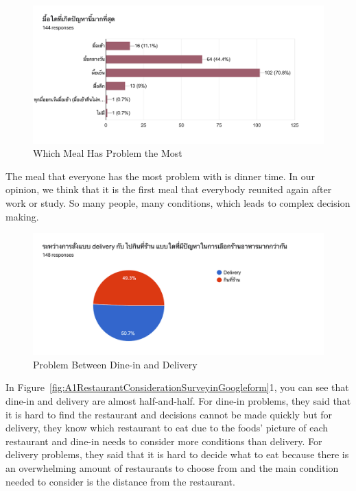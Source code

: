 \documentclass[12pt,oneside,openright,a4paper]{cpe-english-project}
\begin{document}
\begin{figure}[H]\centering
\includegraphics[width=350pt]{./images/A1WhichMealHasProblemtheMost.png}
\caption{Which Meal Has Problem the Most}\label{fig:A1WhichMealHasProblemtheMost}
\end{figure}

The meal that everyone has the most problem with is dinner time. In our opinion, we think that it is the first meal that everybody reunited again after work or study. So many people, many conditions, which leads to complex decision making.

\begin{figure}[H]\centering
\includegraphics[width=350pt]{./images/A1ProblemBetweenDine-inandDelivery.png}
\caption{Problem Between Dine-in and Delivery}\label{fig:A1ProblemBetweenDine-inandDelivery}
\end{figure}

In Figure~\ref{fig:A1RestaurantConsiderationSurveyinGoogleform}1, you can see that dine-in and delivery are almost half-and-half. For dine-in problems, they said that it is hard to find the restaurant and decisions cannot be made quickly but for delivery, they know which restaurant to eat due to the foods’ picture of each restaurant and dine-in needs to consider more conditions than delivery. For delivery problems, they said that it is hard to decide what to eat because there is an overwhelming amount of restaurants to choose from and the main condition needed to consider is the distance from the restaurant.
\end{document}
